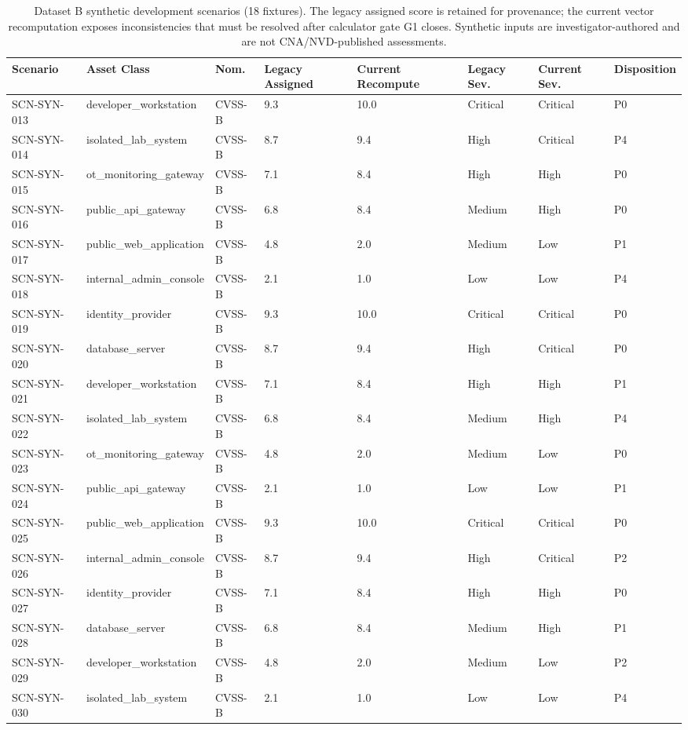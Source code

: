 \begin{landscape}
\begin{table}[p]
\centering\scriptsize
\caption{Dataset B synthetic development scenarios (18 fixtures). The legacy assigned score is retained for provenance; the current vector recomputation exposes inconsistencies that must be resolved after calculator gate G1 closes. Synthetic inputs are investigator-authored and are not CNA/NVD-published assessments.}
\label{tab:dataset_b_v2_synth}
\begin{adjustbox}{max width=\linewidth}
\begin{tabular}{llllllll}
\toprule
\textbf{Scenario} & \textbf{Asset Class} & \textbf{Nom.} & \textbf{Legacy Assigned} & \textbf{Current Recompute} & \textbf{Legacy Sev.} & \textbf{Current Sev.} & \textbf{Disposition} \\
\midrule
SCN-SYN-013 & developer\_workstation & CVSS-B & 9.3 & 10.0 & Critical & Critical & P0 \\
SCN-SYN-014 & isolated\_lab\_system & CVSS-B & 8.7 & 9.4 & High & Critical & P4 \\
SCN-SYN-015 & ot\_monitoring\_gateway & CVSS-B & 7.1 & 8.4 & High & High & P0 \\
SCN-SYN-016 & public\_api\_gateway & CVSS-B & 6.8 & 8.4 & Medium & High & P0 \\
SCN-SYN-017 & public\_web\_application & CVSS-B & 4.8 & 2.0 & Medium & Low & P1 \\
SCN-SYN-018 & internal\_admin\_console & CVSS-B & 2.1 & 1.0 & Low & Low & P4 \\
SCN-SYN-019 & identity\_provider & CVSS-B & 9.3 & 10.0 & Critical & Critical & P0 \\
SCN-SYN-020 & database\_server & CVSS-B & 8.7 & 9.4 & High & Critical & P0 \\
SCN-SYN-021 & developer\_workstation & CVSS-B & 7.1 & 8.4 & High & High & P1 \\
SCN-SYN-022 & isolated\_lab\_system & CVSS-B & 6.8 & 8.4 & Medium & High & P4 \\
SCN-SYN-023 & ot\_monitoring\_gateway & CVSS-B & 4.8 & 2.0 & Medium & Low & P0 \\
SCN-SYN-024 & public\_api\_gateway & CVSS-B & 2.1 & 1.0 & Low & Low & P1 \\
SCN-SYN-025 & public\_web\_application & CVSS-B & 9.3 & 10.0 & Critical & Critical & P0 \\
SCN-SYN-026 & internal\_admin\_console & CVSS-B & 8.7 & 9.4 & High & Critical & P2 \\
SCN-SYN-027 & identity\_provider & CVSS-B & 7.1 & 8.4 & High & High & P0 \\
SCN-SYN-028 & database\_server & CVSS-B & 6.8 & 8.4 & Medium & High & P1 \\
SCN-SYN-029 & developer\_workstation & CVSS-B & 4.8 & 2.0 & Medium & Low & P2 \\
SCN-SYN-030 & isolated\_lab\_system & CVSS-B & 2.1 & 1.0 & Low & Low & P4 \\
\bottomrule
\end{tabular}
\end{adjustbox}
\end{table}
\end{landscape}
